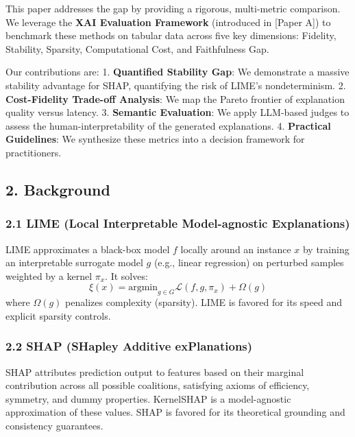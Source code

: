 \documentclass[
]{article}
\begin{document}
This paper addresses the gap by providing a rigorous, multi-metric
comparison. We leverage the \textbf{XAI Evaluation Framework}
(introduced in {[}Paper A{]}) to benchmark these methods on tabular data
across five key dimensions: Fidelity, Stability, Sparsity, Computational
Cost, and Faithfulness Gap.

Our contributions are: 1. \textbf{Quantified Stability Gap}: We
demonstrate a massive stability advantage for SHAP, quantifying the risk
of LIME's nondeterminism. 2. \textbf{Cost-Fidelity Trade-off Analysis}:
We map the Pareto frontier of explanation quality versus latency. 3.
\textbf{Semantic Evaluation}: We apply LLM-based judges to assess the
human-interpretability of the generated explanations. 4.
\textbf{Practical Guidelines}: We synthesize these metrics into a
decision framework for practitioners.

\hypertarget{background}{%
\subsection{2. Background}\label{background}}

\hypertarget{lime-local-interpretable-model-agnostic-explanations}{%
\subsubsection{2.1 LIME (Local Interpretable Model-agnostic
Explanations)}\label{lime-local-interpretable-model-agnostic-explanations}}

LIME approximates a black-box model \(f\) locally around an instance
\(x\) by training an interpretable surrogate model \(g\) (e.g., linear
regression) on perturbed samples weighted by a kernel \(\pi_x\). It
solves:
\[ \xi(x) = \text{argmin}_{g \in G} \mathcal{L}(f, g, \pi_x) + \Omega(g) \]
where \(\Omega(g)\) penalizes complexity (sparsity). LIME is favored for
its speed and explicit sparsity controls.

\hypertarget{shap-shapley-additive-explanations}{%
\subsubsection{2.2 SHAP (SHapley Additive
exPlanations)}\label{shap-shapley-additive-explanations}}

SHAP attributes prediction output to features based on their marginal
contribution across all possible coalitions, satisfying axioms of
efficiency, symmetry, and dummy properties. KernelSHAP is a
model-agnostic approximation of these values. SHAP is favored for its
theoretical grounding and consistency guarantees.
\end{document}
